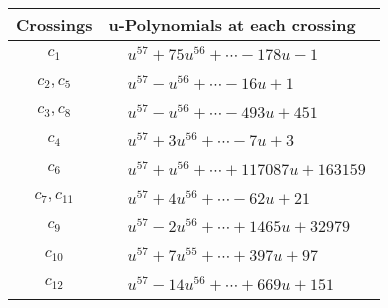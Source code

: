 \documentclass[1p]{elsarticle_modified}
\theoremstyle{definition}
\begin{document}
\begin{tabular}{m{50pt}|m{274pt}}
Crossings & \hspace{64pt}u-Polynomials at each crossing \\
\hline $$\begin{aligned}c_{1}\end{aligned}$$&$\begin{aligned}
&u^{57}+75 u^{56}+\cdots-178 u-1
\end{aligned}$\\
\hline $$\begin{aligned}c_{2},c_{5}\end{aligned}$$&$\begin{aligned}
&u^{57}- u^{56}+\cdots-16 u+1
\end{aligned}$\\
\hline $$\begin{aligned}c_{3},c_{8}\end{aligned}$$&$\begin{aligned}
&u^{57}- u^{56}+\cdots-493 u+451
\end{aligned}$\\
\hline $$\begin{aligned}c_{4}\end{aligned}$$&$\begin{aligned}
&u^{57}+3 u^{56}+\cdots-7 u+3
\end{aligned}$\\
\hline $$\begin{aligned}c_{6}\end{aligned}$$&$\begin{aligned}
&u^{57}+u^{56}+\cdots+117087 u+163159
\end{aligned}$\\
\hline $$\begin{aligned}c_{7},c_{11}\end{aligned}$$&$\begin{aligned}
&u^{57}+4 u^{56}+\cdots-62 u+21
\end{aligned}$\\
\hline $$\begin{aligned}c_{9}\end{aligned}$$&$\begin{aligned}
&u^{57}-2 u^{56}+\cdots+1465 u+32979
\end{aligned}$\\
\hline $$\begin{aligned}c_{10}\end{aligned}$$&$\begin{aligned}
&u^{57}+7 u^{55}+\cdots+397 u+97
\end{aligned}$\\
\hline $$\begin{aligned}c_{12}\end{aligned}$$&$\begin{aligned}
&u^{57}-14 u^{56}+\cdots+669 u+151
\end{aligned}$\\
\hline
\end{tabular}\\~\\
\end{document}
